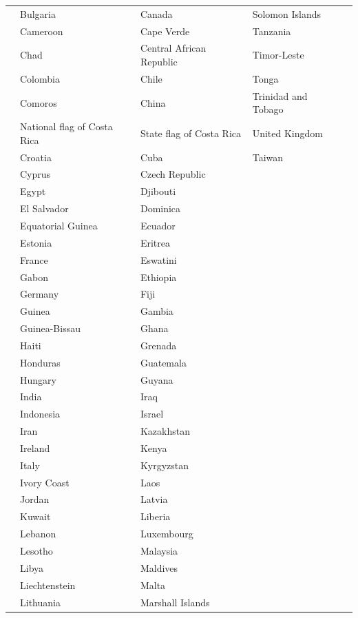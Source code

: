 \documentclass[11pt]{amsart}
\begin{document}
\begin{table}[h]
\begin{tabular}{lllll}
        & Bulgaria & Canada & Solomon Islands & \\
        & Cameroon & Cape Verde & Tanzania & \\
        & Chad & Central African Republic & Timor-Leste & \\
        & Colombia & Chile & Tonga & \\
        & Comoros & China & Trinidad and Tobago & \\
        & National flag of Costa Rica & State flag of Costa Rica & United Kingdom & \\
        & Croatia & Cuba & Taiwan & \\
        & Cyprus & Czech Republic & & \\
        & Egypt & Djibouti & & \\
        & El Salvador & Dominica & & \\
        & Equatorial Guinea & Ecuador & & \\
        & Estonia & Eritrea & & \\
        & France & Eswatini & & \\
        & Gabon & Ethiopia & & \\
        & Germany & Fiji & & \\
        & Guinea & Gambia & & \\
        & Guinea-Bissau & Ghana & & \\
        & Haiti & Grenada & & \\
        & Honduras & Guatemala & & \\
        & Hungary & Guyana & & \\
        & India & Iraq & & \\
        & Indonesia & Israel & & \\
        & Iran & Kazakhstan & & \\
        & Ireland & Kenya & & \\
        & Italy & Kyrgyzstan & & \\
        & Ivory Coast & Laos & & \\
        & Jordan & Latvia & & \\
        & Kuwait & Liberia & & \\
        & Lebanon & Luxembourg & & \\
        & Lesotho & Malaysia & & \\
        & Libya & Maldives & & \\
        & Liechtenstein & Malta & & \\
        & Lithuania & Marshall Islands & & \\

\end{tabular}
\end{table}
\end{document}
